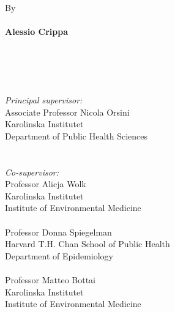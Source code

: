 %
\null
\vspace{1.5cm}
\\
\\
\\
\\
\\
By
\\
\\
{\Large \textbf{\textsf{Alessio Crippa}}}
\\
\\
\\
\\
\\
\begin{minipage}[t]{6.25cm}
\singlespacing
{\small
\textit{Principal supervisor:}\\
Associate Professor Nicola Orsini \\
Karolinska Institutet \\
Department of Public Health Sciences \\
\\
\\
\textit{Co-supervisor:}\\
Professor Alicja Wolk \\
Karolinska Institutet \\
Institute of Environmental Medicine \\
\\
Professor Donna Spiegelman \\
Harvard T.H. Chan School of Public Health \\
Department of Epidemiology \\
\\
Professor Matteo Bottai \\
Karolinska Institutet \\
Institute of Environmental Medicine \\
}
\end{minipage}
\hspace{1.5cm}
